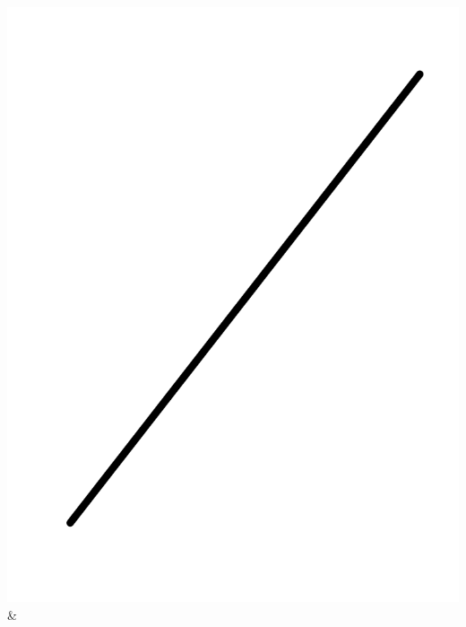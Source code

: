 \documentclass[
  letterpaper,
  DIV=11,
  numbers=noendperiod,
  oneside]{article}
\begin{document}
\begin{multicols}{2}
\begin{table}
\begin{minipage}[t]{\linewidth}
{\begin{longtable}[]
\includegraphics{Preliminaries/www/pb-proportional.png} &

\end{longtable}}
\end{minipage}
\end{table}
\end{multicols}
\end{document}
